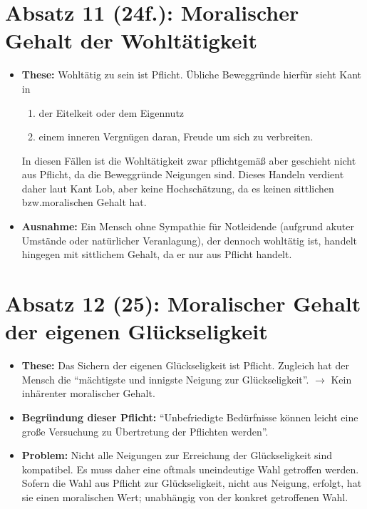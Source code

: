 \documentclass{llncs}
\begin{document}
\section*{Absatz 11 (24f.): Moralischer Gehalt der Wohltätigkeit}

\begin{itemize}
	\item \textbf{These:} Wohltätig zu sein ist Pflicht.
		Übliche Beweggründe hierfür sieht Kant in
		\begin{enumerate}
			\item der Eitelkeit oder dem Eigennutz
			\item einem inneren Vergnügen daran, Freude um sich zu verbreiten.
		\end{enumerate}
		In diesen Fällen ist die Wohltätigkeit zwar pflichtgemäß aber geschieht nicht aus Pflicht, da die Beweggründe Neigungen sind.
		Dieses Handeln verdient daher laut Kant Lob, aber keine Hochschätzung, da es keinen sittlichen bzw.\@ moralischen Gehalt hat.
	\item \textbf{Ausnahme:} Ein Mensch ohne Sympathie für Notleidende (aufgrund akuter Umstände oder natürlicher Veranlagung), der dennoch wohltätig ist, handelt hingegen mit sittlichem Gehalt, da er nur aus Pflicht handelt.
\end{itemize}

\section*{Absatz 12 (25): Moralischer Gehalt der eigenen Glückseligkeit}

\begin{itemize}
	\item \textbf{These:} Das Sichern der eigenen Glückseligkeit ist Pflicht. Zugleich hat der Mensch die ``mächtigste und innigste Neigung zur Glückseligkeit''. $\rightarrow$ Kein inhärenter moralischer Gehalt.
	\item \textbf{Begründung dieser Pflicht:} ``Unbefriedigte Bedürfnisse können leicht eine große Versuchung zu Übertretung der Pflichten werden''.
	\item \textbf{Problem:} Nicht alle Neigungen zur Erreichung der Glückseligkeit sind kompatibel.
		Es muss daher eine oftmals uneindeutige Wahl getroffen werden.
		Sofern die Wahl aus Pflicht zur Glückseligkeit, nicht aus Neigung, erfolgt, hat sie einen moralischen Wert;
		unabhängig von der konkret getroffenen Wahl.
\end{itemize}
\end{document}
